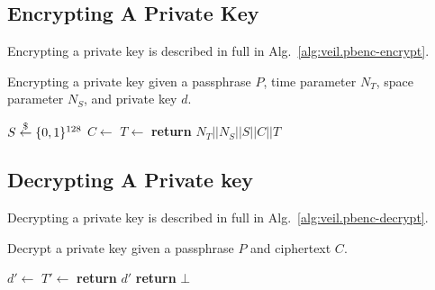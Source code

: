 \subsection{Encrypting A Private Key}\label{subsec:veil.pbenc-encrypt}

Encrypting a private key is described in full in Alg.~\ref{alg:veil.pbenc-encrypt}.

\begin{algorithm}[ht]
    \caption{
        Encrypting a private key given a passphrase $P$, time parameter $N_T$, space parameter $N_S$, and
        private key $d$.
    }
    \begin{algorithmic}
            \State $S \stackrel{\$}{\gets} \{0,1\}^{128}$
            \State {}
            \State $C \gets$
            \State $T \gets$
            \State \textbf{return} $N_T || N_S || S || C ||T$
        \EndFunction
    \end{algorithmic}
    \label{alg:veil.pbenc-encrypt}
\end{algorithm}

\subsection{Decrypting A Private key}\label{subsec:veil.pbenc-decrypt}

Decrypting a private key is described in full in Alg.~\ref{alg:veil.pbenc-decrypt}.

\begin{algorithm}[ht]
    \caption{
        Decrypt a private key given a passphrase $P$ and ciphertext $C$.
    }
    \begin{algorithmic}
            \State {}
            \State $d' \gets$
            \State $T' \gets$
            \State \textbf{return} $d'$
            \Else
                \State \textbf{return} $\bot$
            \EndIf
        \EndFunction
    \end{algorithmic}
    \label{alg:veil.pbenc-decrypt}
\end{algorithm}

